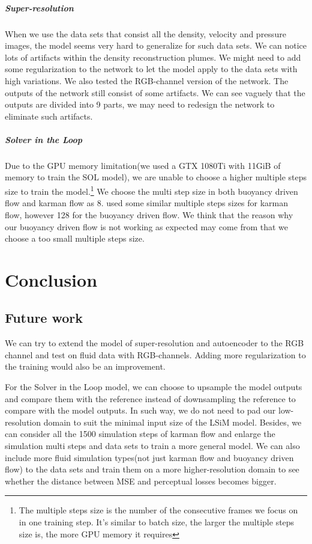 \documentclass[a4paper,12pt,twoside]{report}
\begin{document}
\paragraph{Super-resolution} When we use the data sets that consist all the density, velocity and pressure images, the model seems very hard to generalize for such data sets. We can notice lots of artifacts within the density reconstruction plumes. We might need to add some regularization to the network to let the model apply to the data sets with high variations. We also tested the RGB-channel version of the network. The outputs of the network still consist of some artifacts. We can see vaguely that the outputs are divided into 9 parts, we may need to redesign the network to eliminate such artifacts.
\paragraph{Solver in the Loop}Due to the GPU memory limitation(we used a GTX 1080Ti with 11GiB of memory to train the SOL  model), we are unable to choose a higher multiple steps size to train the model.\footnote{The multiple steps size is the number of the consecutive frames we focus on in one training step. It's similar to batch size, the larger the multiple steps size is, the more GPU memory it requires} We choose the multi step size in both buoyancy driven flow and karman flow as 8. \citeauthor{um2020sol} used some similar multiple steps sizes for karman flow, however 128 for the buoyancy driven flow. We think that the reason why our buoyancy driven flow is not working as expected may come from that we choose a too small multiple steps size.





\chapter{Conclusion}
\section{Future work}
We can try to extend the model of super-resolution and autoencoder to the RGB channel and test on fluid data with RGB-channels. Adding more regularization to the training would also be an improvement.

For the Solver in the Loop model, we can choose to upsample the model outputs and compare them with the reference instead of downsampling the reference to compare with the model outputs. In such way, we do not need to pad our low-resolution domain to suit the minimal input size of the LSiM model. Besides, we can consider all the 1500 simulation steps of karman flow and enlarge the simulation multi steps and data sets to train a more general model. We can also include more fluid simulation types(not just karman flow and buoyancy driven flow) to the data sets and train them on a more higher-resolution domain to see whether the distance between MSE and perceptual losses becomes bigger.
\end{document}
